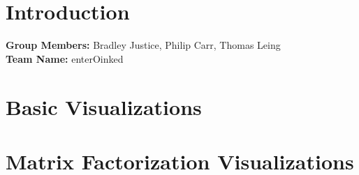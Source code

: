 \newif\ifshowsolutions
\showsolutionstrue







\pagestyle{fancy}




\newpage

\section{Introduction}
\noindent
\textbf{Group Members:} Bradley Justice, Philip Carr, Thomas Leing
\\
\textbf{Team Name:} enterOinked
\newpage

\section{Basic Visualizations}
\newpage

\section{Matrix Factorization Visualizations}


